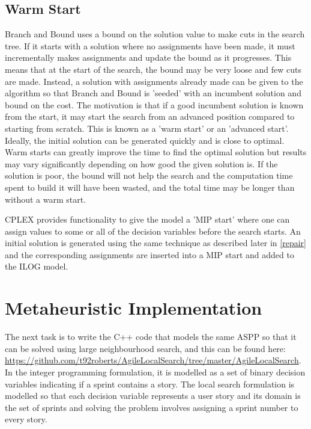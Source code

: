 \subsection{Warm Start} \label{subsec:warm_start}
Branch and Bound uses a bound on the solution value to make cuts in the search tree. If it starts with a solution where no assignments have been made, it must incrementally makes assignments and update the bound as it progresses. This means that at the start of the search, the bound may be very loose and few cuts are made. Instead, a solution with assignments already made can be given to the algorithm so that Branch and Bound is 'seeded' with an incumbent solution and bound on the cost. The motivation is that if a good incumbent solution is known from the start, it may start the search from an advanced position compared to starting from scratch. This is known as a 'warm start' or an 'advanced start'. Ideally, the initial solution can be generated quickly and is close to optimal. Warm starts can greatly improve the time to find the optimal solution but results may vary significantly depending on how good the given solution is. If the solution is poor, the bound will not help the search and the computation time spent to build it will have been wasted, and the total time may be longer than without a warm start.

CPLEX provides functionality to give the model a 'MIP start' where one can assign values to some or all of the decision variables before the search starts. An initial solution is generated using the same technique as described later in \cref{repair} and the corresponding assignments are inserted into a MIP start and added to the ILOG model.

\section{Metaheuristic Implementation}

The next task is to write the C++ code that models the same ASPP so that it can be solved using large neighbourhood search, and this can be found here: \url{https://github.com/t92roberts/AgileLocalSearch/tree/master/AgileLocalSearch}. In the integer programming formulation, it is modelled as a set of binary decision variables indicating if a sprint contains a story. The local search formulation is modelled so that each decision variable represents a user story and its domain is the set of sprints and solving the problem involves assigning a sprint number to every story.

